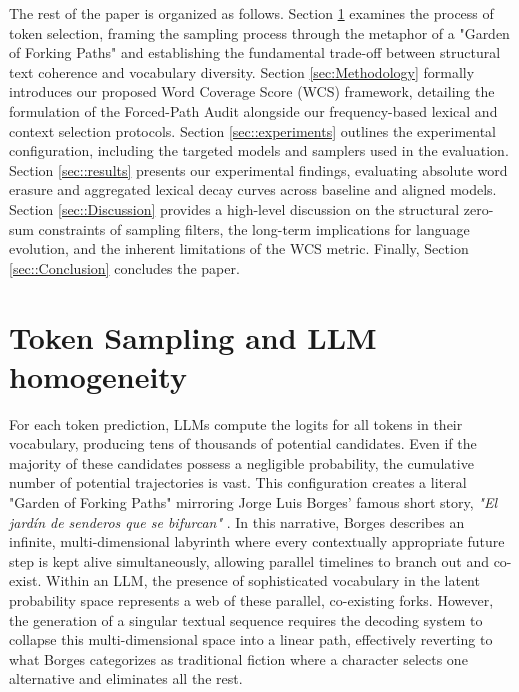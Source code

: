 \documentclass{article}
\begin{document}
The rest of the paper is organized as follows. Section \ref{sec:Sampling} examines the process of token selection, framing the sampling process through the metaphor of a "Garden of Forking Paths" and establishing the fundamental trade-off between structural text coherence and vocabulary diversity. Section \ref{sec:Methodology} formally introduces our proposed Word Coverage Score (WCS) framework, detailing the formulation of the Forced-Path Audit alongside our frequency-based lexical and context selection protocols. Section \ref{sec::experiments} outlines the experimental configuration, including the targeted models and samplers used in the evaluation. Section \ref{sec::results} presents our experimental findings, evaluating absolute word erasure and aggregated lexical decay curves across baseline and aligned models. Section \ref{sec::Discussion} provides a high-level discussion on the structural zero-sum constraints of sampling filters, the long-term implications for language evolution, and the inherent limitations of the WCS metric. Finally, Section \ref{sec::Conclusion} concludes the paper.

\section{Token Sampling and LLM homogeneity}
\label{sec:Sampling}

For each token prediction, LLMs compute the logits for all tokens in their vocabulary, producing tens of thousands of potential candidates. Even if the majority of these candidates possess a negligible probability, the cumulative number of potential trajectories is vast. This configuration creates a literal "Garden of Forking Paths" mirroring Jorge Luis Borges' famous short story, \textit{"El jard{\'i}n de senderos que se bifurcan"} \cite{borges1998garden}. In this narrative, Borges describes an infinite, multi-dimensional labyrinth where every contextually appropriate future step is kept alive simultaneously, allowing parallel timelines to branch out and co-exist. Within an LLM, the presence of sophisticated vocabulary in the latent probability space represents a web of these parallel, co-existing forks. However, the generation of a singular textual sequence requires the decoding system to collapse this multi-dimensional space into a linear path, effectively reverting to what Borges categorizes as traditional fiction where a character selects one alternative and eliminates all the rest.
\end{document}

